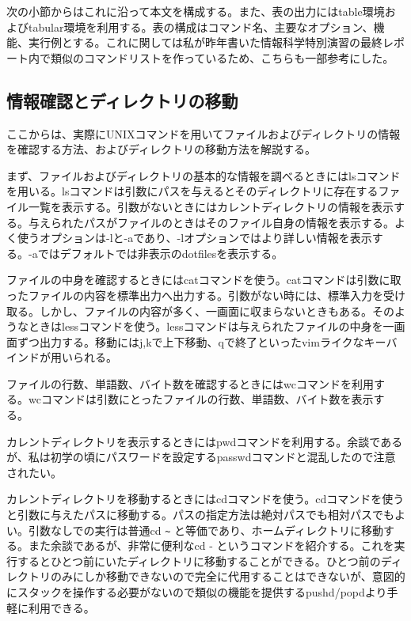 \documentclass[dvipdfmx,12pt,a4j]{jarticle}
\begin{document}
次の小節からはこれに沿って本文を構成する。また、表の出力にはtable環境およびtabular環境を利用する。表の構成はコマンド名、主要なオプション、機能、実行例とする。これに関しては私が昨年書いた情報科学特別演習の最終レポート内で類似のコマンドリストを作っているため、こちらも一部参考にした。

\subsection{情報確認とディレクトリの移動}
ここからは、実際にUNIXコマンドを用いてファイルおよびディレクトリの情報を確認する方法、およびディレクトリの移動方法を解説する。

まず、ファイルおよびディレクトリの基本的な情報を調べるときにはlsコマンドを用いる。lsコマンドは引数にパスを与えるとそのディレクトリに存在するファイル一覧を表示する。引数がないときにはカレントディレクトリの情報を表示する。与えられたパスがファイルのときはそのファイル自身の情報を表示する。よく使うオプションは-lと-aであり、-lオプションではより詳しい情報を表示する。-aではデフォルトでは非表示のdotfilesを表示する。

ファイルの中身を確認するときにはcatコマンドを使う。catコマンドは引数に取ったファイルの内容を標準出力へ出力する。引数がない時には、標準入力を受け取る。しかし、ファイルの内容が多く、一画面に収まらないときもある。そのようなときはlessコマンドを使う。lessコマンドは与えられたファイルの中身を一画面ずつ出力する。移動にはj,kで上下移動、qで終了といったvimライクなキーバインドが用いられる。

ファイルの行数、単語数、バイト数を確認するときにはwcコマンドを利用する。wcコマンドは引数にとったファイルの行数、単語数、バイト数を表示する。

カレントディレクトリを表示するときにはpwdコマンドを利用する。余談であるが、私は初学の頃にパスワードを設定するpasswdコマンドと混乱したので注意されたい。

カレントディレクトリを移動するときにはcdコマンドを使う。cdコマンドを使うと引数に与えたパスに移動する。パスの指定方法は絶対パスでも相対パスでもよい。引数なしでの実行は普通cd \verb|~| と等価であり、ホームディレクトリに移動する。また余談であるが、非常に便利なcd - というコマンドを紹介する。これを実行するとひとつ前にいたディレクトリに移動することができる。ひとつ前のディレクトリのみにしか移動できないので完全に代用することはできないが、意図的にスタックを操作する必要がないので類似の機能を提供するpushd/popdより手軽に利用できる。
\end{document}
